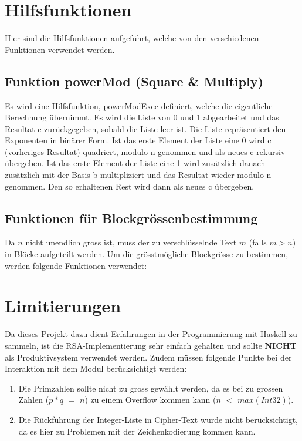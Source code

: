 \documentclass[a4paper, 11pt]{article} %
\begin{document}
\section{Hilfsfunktionen}
Hier sind die Hilfsfunktionen aufgeführt, welche von den verschiedenen Funktionen verwendet werden.

\subsection{Funktion powerMod (Square \& Multiply)}
Es wird eine Hilfsfunktion, powerModExec definiert, welche die eigentliche Berechnung übernimmt. Es wird die Liste von 0 und 1 abgearbeitet und das Resultat c zurückgegeben, sobald die Liste leer ist. Die Liste repräsentiert den Exponenten in binärer Form. Ist das erste Element der Liste eine 0 wird c (vorheriges Resultat) quadriert, modulo n genommen und als neues c rekursiv übergeben. Ist das erste Element der Liste eine 1 wird zusätzlich danach zusätzlich mit der Basis b multipliziert und das Resultat wieder modulo n genommen. Den so erhaltenen Rest wird dann als neues c übergeben.


\subsection{Funktionen für Blockgrössenbestimmung}
Da $n$ nicht unendlich gross ist, muss der zu verschlüsselnde Text $m$ (falls $m>n$) in Blöcke aufgeteilt werden. Um die grösstmögliche Blockgrösse zu bestimmen, werden folgende Funktionen verwendet:


\section{Limitierungen}
Da dieses Projekt dazu dient Erfahrungen in der Programmierung mit Haskell zu sammeln, ist die RSA-Implementierung sehr einfach gehalten und sollte \textbf{NICHT} als Produktivsystem verwendet werden. Zudem müssen folgende Punkte bei der Interaktion mit dem Modul berücksichtigt werden:
\begin{enumerate}
\item Die Primzahlen sollte nicht zu gross gewählt werden, da es bei zu grossen Zahlen ($p*q$ $=$ $n$) zu einem Overflow kommen kann ($n$ $<$ $max(Int32)$).
\item Die Rückführung der Integer-Liste in Cipher-Text wurde nicht berücksichtigt, da es hier zu Problemen mit der Zeichenkodierung kommen kann.
\end{enumerate}
\end{document}
